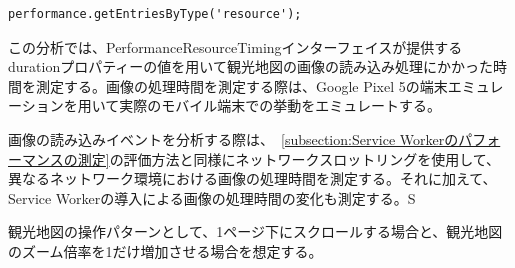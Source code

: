 \begin{lstlisting}[caption={Resource Timing APIによる画像の処理時間の取得},label={lst:Resource Timing APIによる画像の処理時間の取得}]
performance.getEntriesByType('resource');
\end{lstlisting}

この分析では、PerformanceResourceTimingインターフェイスが提供するdurationプロパティーの値を用いて観光地図の画像の読み込み処理にかかった時間を測定する。画像の処理時間を測定する際は、Google Pixel 5の端末エミュレーションを用いて実際のモバイル端末での挙動をエミュレートする。

画像の読み込みイベントを分析する際は、~\autoref{subsection:Service Workerのパフォーマンスの測定}の評価方法と同様にネットワークスロットリングを使用して、異なるネットワーク環境における画像の処理時間を測定する。それに加えて、Service Workerの導入による画像の処理時間の変化も測定する。S

観光地図の操作パターンとして、1ページ下にスクロールする場合と、観光地図のズーム倍率を1だけ増加させる場合を想定する。